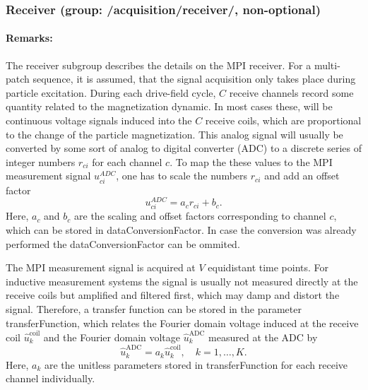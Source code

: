 \documentclass[landscape,a4paper]{article} %
\newcommand{\inlvar}[1]{{\ttfamily#1}}
\begin{document}
\subsubsection{Receiver (group: \inlvar{/acquisition/receiver/}, non-optional)}

\begin{multicols}{2}
	\paragraph{Remarks:} The receiver subgroup describes the details on the MPI receiver. For a multi-patch sequence, it is assumed, that the signal acquisition only takes place during particle excitation. During each drive-field cycle, $C$ receive channels record some quantity related to the magnetization dynamic. In most cases these, will be continuous voltage signals induced into the $C$ receive coils, which are proportional to the change of the particle magnetization. This analog signal will usually be converted by some sort of analog to digital converter (ADC) to a discrete series of integer numbers $r_{ci}$ for each channel $c$. To map the these values to the MPI measurement signal $u_{ci}^{ADC}$, one has to scale the numbers $r_{ci}$ and add an offset factor
\begin{equation*}
	u_{ci}^{ADC} = a_c r_{ci} +b_c.
\end{equation*}
Here, $a_c$ and $b_c$ are the scaling and offset factors corresponding to channel $c$, which can be stored in \inlvar{dataConversionFactor}. In case the conversion was already performed the \inlvar{dataConversionFactor} can be ommited.

The MPI measurement signal is acquired at $V$ equidistant time points. For inductive measurement systems the signal is usually not measured directly at the receive coils but amplified and filtered first, which may damp and distort the signal. Therefore, a transfer function can be stored in the parameter \inlvar{transferFunction}, which relates the Fourier domain voltage induced at the receive coil $\hat{u}_k^\text{coil}$ and the Fourier domain voltage $\hat{u}_k^\text{ADC}$ measured at the ADC by
\begin{equation*}
\hat{u}_k^\text{ADC} = a_k  \hat{u}_k^\text{coil}, \quad k=1,\dots,K.
\end{equation*}
Here, $a_k$ are the unitless parameters stored in \inlvar{transferFunction} for each receive channel individually. 


\end{multicols}
\end{document}
